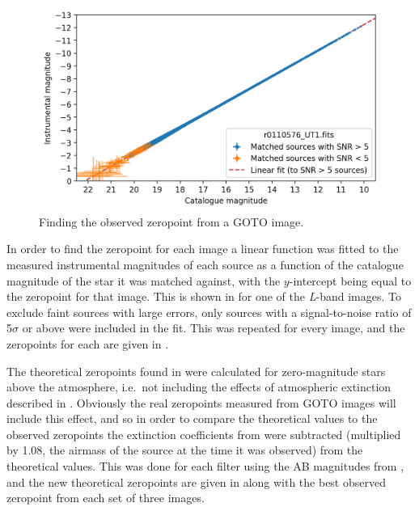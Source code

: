 \begin{colsection}
\begin{colsection}
\begin{figure}[t]
    \begin{center}
        \includegraphics[width=\textwidth]{images/throughput/zeropoint_real.png}
    \end{center}
    \caption[Finding the observed zeropoint from a GOTO image]{
        Finding the observed zeropoint from a GOTO image.
    }\label{fig:zeropoint}
\end{figure}

In order to find the zeropoint for each image a linear function was fitted to the measured instrumental magnitudes of each source as a function of the catalogue magnitude of the star it was matched against, with the $y$-intercept being equal to the zeropoint for that image. This is shown in  for one of the \textit{L}-band images. To exclude faint sources with large errors, only sources with a signal-to-noise ratio of 5$\sigma$ or above were included in the fit. This was repeated for every image, and the zeropoints for each are given in .

The theoretical zeropoints found in  were calculated for zero-magnitude stars above the atmosphere, i.e.\ not including the effects of atmospheric extinction described in . Obviously the real zeropoints measured from GOTO images will include this effect, and so in order to compare the theoretical values to the observed zeropoints the extinction coefficients from  were subtracted (multiplied by 1.08, the airmass of the source at the time it was observed) from the theoretical values. This was done for each filter using the AB magnitudes from , and the new theoretical zeropoints are given in  along with the best observed zeropoint from each set of three images.


\end{colsection}
\end{colsection}
